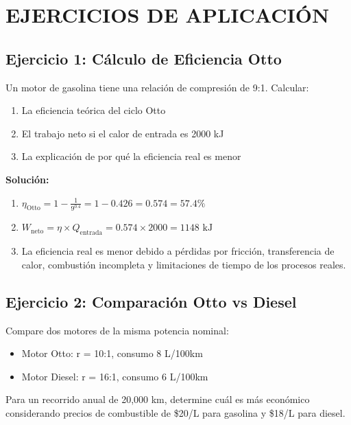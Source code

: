 \documentclass{article}
\begin{document}
\vspace{5mm}

\section*{EJERCICIOS DE APLICACIÓN}

\subsection*{Ejercicio 1: Cálculo de Eficiencia Otto}

Un motor de gasolina tiene una relación de compresión de 9:1. Calcular:
\begin{enumerate}
    \item La eficiencia teórica del ciclo Otto
    \item El trabajo neto si el calor de entrada es 2000 kJ
    \item La explicación de por qué la eficiencia real es menor
\end{enumerate}

\textbf{Solución:}
\begin{enumerate}
    \item $\eta_{\text{Otto}} = 1 - \frac{1}{9^{0.4}} = 1 - 0.426 = 0.574 = 57.4\%$
    \item $W_{\text{neto}} = \eta \times Q_{\text{entrada}} = 0.574 \times 2000 = 1148 \text{ kJ}$
    \item La eficiencia real es menor debido a pérdidas por fricción, transferencia de calor, combustión incompleta y limitaciones de tiempo de los procesos reales.
\end{enumerate}

\subsection*{Ejercicio 2: Comparación Otto vs Diesel}

Compare dos motores de la misma potencia nominal:
\begin{itemize}
    \item Motor Otto: r = 10:1, consumo 8 L/100km
    \item Motor Diesel: r = 16:1, consumo 6 L/100km
\end{itemize}

Para un recorrido anual de 20,000 km, determine cuál es más económico considerando precios de combustible de \$20/L para gasolina y \$18/L para diesel.

\vspace{5mm}
\end{document}
